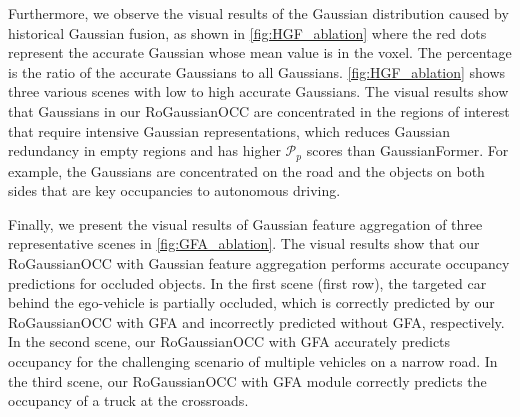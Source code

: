 \documentclass[journal]{IEEEtran}
\begin{document}
Furthermore, we observe the visual results of the Gaussian distribution caused by historical Gaussian fusion, as shown in \autoref{fig:HGF_ablation} where the red dots represent the accurate Gaussian whose mean value is in the voxel.
The percentage is the ratio of the accurate Gaussians to all Gaussians.
\autoref{fig:HGF_ablation} shows three various scenes with low to high accurate Gaussians. 
The visual results show that Gaussians in our RoGaussianOCC are concentrated in the regions of interest that require intensive Gaussian representations, which reduces Gaussian redundancy in empty regions and has higher {\small $\mathcal{P}_p$} scores than GaussianFormer.
For example, the Gaussians are concentrated on the road and the objects on both sides that are key occupancies to autonomous driving.

Finally, we present the visual results of Gaussian feature aggregation of three representative scenes in \autoref{fig:GFA_ablation}.
The visual results show that our RoGaussianOCC with Gaussian feature aggregation performs accurate occupancy predictions for occluded objects. 
In the first scene (first row), the targeted car behind the ego-vehicle is partially occluded, which is correctly predicted by our RoGaussianOCC with GFA and incorrectly predicted without GFA, respectively.   
In the second scene, our RoGaussianOCC with GFA accurately predicts occupancy for the challenging scenario of multiple vehicles on a narrow road.
In the third scene, our RoGaussianOCC with GFA module correctly predicts the occupancy of a truck at the crossroads. 
\end{document}
